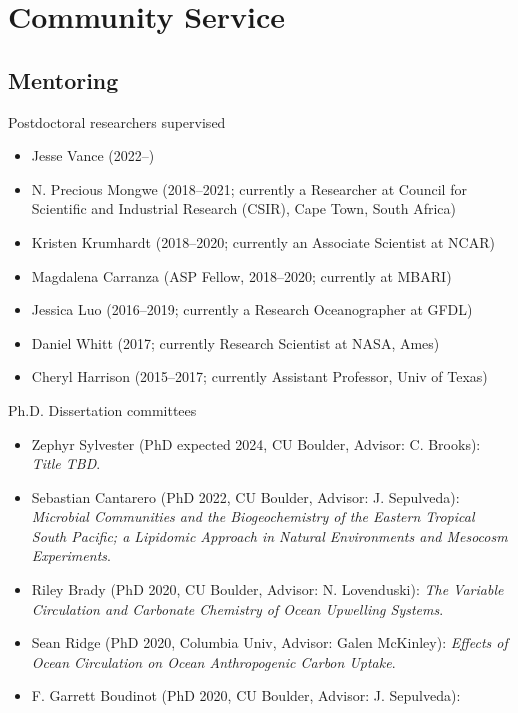 \documentclass[11pt]{article}
\begin{document}
\section{Community Service}

\subsection*{Mentoring}

\begin{description}[style=multiline,leftmargin=0.5cm,font=\normalfont]
\item Postdoctoral researchers supervised
	\begin{itemize}
	\item Jesse Vance (2022--)
	\item N. Precious Mongwe (2018--2021; currently a Researcher at Council for Scientific and Industrial Research (CSIR), Cape Town, South Africa)
	\item Kristen Krumhardt (2018--2020; currently an Associate Scientist at NCAR)
	\item Magdalena Carranza (ASP Fellow, 2018--2020; currently at MBARI)
	\item Jessica Luo (2016--2019; currently a Research Oceanographer at GFDL)
	\item Daniel Whitt (2017; currently Research Scientist at NASA, Ames)
	\item Cheryl Harrison (2015--2017; currently Assistant Professor, Univ of Texas)
	\end{itemize}
\item Ph.D. Dissertation committees
	\begin{itemize}
	\item Zephyr Sylvester (PhD expected 2024, CU Boulder, Advisor: C. Brooks): \textit{Title TBD}.
	\item Sebastian Cantarero (PhD 2022, CU Boulder, Advisor: J. Sepulveda): \textit{Microbial Communities and the Biogeochemistry of the Eastern Tropical South Pacific; a Lipidomic Approach in Natural Environments and Mesocosm Experiments}.
	\item Riley Brady (PhD 2020, CU Boulder, Advisor: N. Lovenduski): \textit{The Variable Circulation and Carbonate Chemistry of Ocean Upwelling Systems}.
	\item Sean Ridge (PhD 2020, Columbia Univ, Advisor: Galen McKinley): \textit{Effects of Ocean Circulation on Ocean Anthropogenic Carbon Uptake}.
	\item F. Garrett Boudinot (PhD 2020, CU Boulder, Advisor: J. Sepulveda):

\end{itemize}
\end{description}
\end{document}
